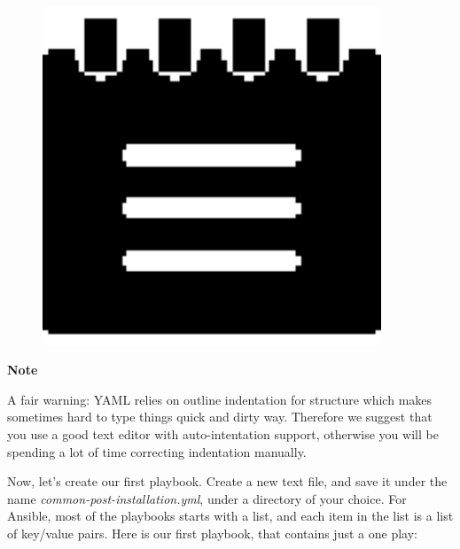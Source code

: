 \documentclass[10pt]{book}
\begin{document}
\begin{mdframed}[style=noteStyle]
\begin{minipage}[b]{0.05\textwidth}
\begin{figure}[H]
\includegraphics[width=0.9\textwidth]{figures/notes-icon.eps} 
\end{figure}
\end{minipage}  
\begin{minipage}[b]{0.05\textwidth}
\textbf{Note}
\end{minipage}

A fair warning:  YAML relies on outline indentation 
for structure which makes sometimes hard to type things quick and dirty way. 
Therefore we suggest that you use a good text editor with auto-intentation support, otherwise you will
be spending a lot of time correcting indentation manually.
\end{mdframed}


Now, let's create our first playbook. Create a new text file, and save it under the name 
\emph{common-post-installation.yml}, under a directory of your choice. For 
Ansible, most of the playbooks starts with a list, and each item in the list is a list of key/value 
pairs. Here is our first playbook, that contains just a one play:

\vspace{10 mm}
 
\end{document}
